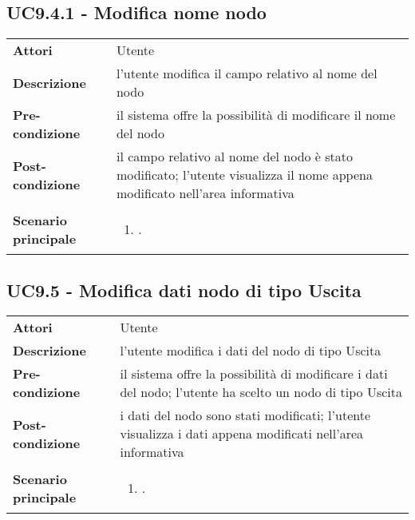 \subsection{UC9.4.1 - Modifica nome nodo} 
\label{sssec:UC9.4.1} 
\def\arraystretch{1.5}
\begin{tabularx}{\textwidth}{l|p{}}
	\rowcolor{I} \multicolumn{2}{c}{\color{white}\textbf{UC9.4.1 - Modifica nome nodo}} \\
	\toprule
	\endhead
	\textbf{Attori} & Utente\\
	\textbf{Descrizione} & l'utente modifica il campo relativo al nome del nodo\\
	\textbf{Pre-condizione} & il sistema offre la possibilità di modificare il nome del nodo\\
	\textbf{Post-condizione} & il campo relativo al nome del nodo è stato modificato; l'utente visualizza il nome appena modificato nell'area informativa\\
	\textbf{Scenario principale} & \vspace{-1.2em}\begin{enumerate}[leftmargin=*,noitemsep,nosep]
		\item \nameref{sssec:UC9.4.1}.
	\end{enumerate}\\
	\bottomrule
\end{tabularx}
\subsection{UC9.5 - Modifica dati nodo di tipo Uscita} 
\label{sssec:UC9.5} 
\def\arraystretch{1.5}
\begin{tabularx}{\textwidth}{l|p{}}
	\rowcolor{I} \multicolumn{2}{c}{\color{white}\textbf{UC9.5 - Modifica dati nodo di tipo Uscita}} \\
	\toprule
	\endhead
	\textbf{Attori} & Utente\\
	\textbf{Descrizione} & l'utente modifica i dati del nodo di tipo Uscita\\
	\textbf{Pre-condizione} & il sistema offre la possibilità di modificare i dati del nodo; l'utente ha scelto un nodo di tipo Uscita\\
	\textbf{Post-condizione} & i dati del nodo sono stati modificati; l'utente visualizza i dati appena modificati nell'area informativa\\
	\textbf{Scenario principale} & \vspace{-1.2em}\begin{enumerate}[leftmargin=*,noitemsep,nosep]
		\item \nameref{sssec:UC9.5}.
	\end{enumerate}\\
	\bottomrule
\end{tabularx}
